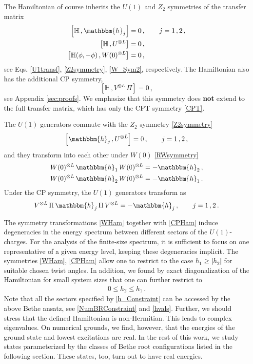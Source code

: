 \documentclass[12pt]{article}
\numberwithin{equation}{section}
\begin{document}
	The Hamiltonian of course inherits the $U(1)$ and $Z_2$ symmetries of the transfer matrix
	\begin{align}
		\left[ \mathbb{H} \,, \mathbbm{h}_j \right] &= 0\,, \qquad j=1\,,2 \,, \label{U1Ham} \\
		\left[ \mathbb{H}\,, U^{\otimes L} \right] &= 0 \,, \label{UHam} \\
		\left[ \mathbb{H}(\phi, -\phi)\,, W(0)^{\otimes L} \right] &= 0\,, \label{WHam}
	\end{align}
	see Eqs. \eqref{U1transf}, \eqref{Z2symmetry}, \eqref{W_Sym2}, respectively. The Hamiltonian also has the additional CP symmetry,
	\begin{equation}
		\left[\mathbb{H} \,, V^{\otimes L}\, \Pi  \right] = 0\,,
		\label{CPHam} 
	\end{equation}
	see Appendix \ref{sec:proofs}. We emphasize that this symmetry does \textbf{not} extend to the full transfer matrix, which has only the CPT symmetry \eqref{CPT}.
	
	The $U(1)$ generators commute with the $Z_2$ symmetry \eqref{Z2symmetry}
	\begin{equation}
		\left[ \mathbbm{h}_j \,, U^{\otimes L} \right]  = 0\,, \qquad j = 1\,, 2 \,,
	\end{equation}
	and they transform into each other under $W(0)$ \eqref{RWsymmetry}
	\begin{align}\label{Wgens}
		W(0)^{\otimes L}\, \mathbbm{h}_1 \, W(0)^{\otimes L} &= - \mathbbm{h}_2\,,\nonumber \\
		W(0)^{\otimes L}\, \mathbbm{h}_2 \, W(0)^{\otimes L} &= - \mathbbm{h}_1\,.
	\end{align}
	Under the CP symmetry, the $U(1)$ generators transform as
	\begin{equation}
		V^{\otimes L}\,   \Pi\, \mathbbm{h}_j\, \Pi\, V^{\otimes L} = -\mathbbm{h}_j\,, \qquad j = 1\,, 2\,.
		\label{CPgens}
	\end{equation}
	
	The symmetry transformations \eqref{WHam} together with \eqref{CPHam} induce degeneracies in the energy spectrum between different sectors of the $U(1)$-charges.  For the analysis of the finite-size spectrum, it is sufficient to focus on one representative of a given energy level, keeping these degeneracies implicit.  The symmetries \eqref{WHam},  \eqref{CPHam} allow one to restrict to the case   $h_1\ge |h_2|$ for suitable chosen twist angles. In addition, we found by exact diagonalization of the Hamiltonian for small system sizes that one can further restrict to 
	\begin{align}
		0\le h_2 \le h_1 \,. 
		\label{h_Constraint}
	\end{align}
	Note that all the sectors specified by \eqref{h_Constraint} can be accessed by the above Bethe ansatz, see \eqref{NumBRConstraint} and \eqref{hvals}.  
	Further, we should stress that the defined Hamiltonian is non-Hermitian. This leads to complex eigenvalues. On numerical grounds, we find, however, that the energies of the ground state and lowest excitations are real.  In the rest of this work, we study states parameterized by the classes of Bethe root configurations listed in the following section.  These states, too, turn out to have real energies.
	
\end{document}
